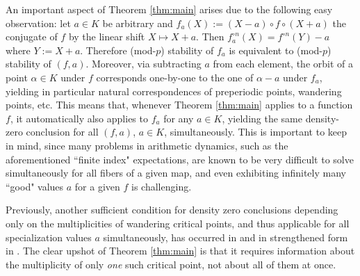 \documentclass[a4paper]{amsart}
\begin{document}
An important aspect of Theorem \ref{thm:main} arises due to the following easy observation: let $a\in K$ be arbitrary and $f_a(X):=(X-a)\circ f\circ (X+a)$ the conjugate of $f$ by the linear shift $X\mapsto X+a$. Then $f_a^{\circ n}(X) = f^{\circ n}(Y) - a$ where $Y:=X+a$. Therefore (mod-$p$) stability of $f_a$ is equivalent to (mod-$p$) stability of $(f,a)$. Moreover, via subtracting $a$ from each element, the orbit of a point $\alpha\in K$ under $f$ corresponds one-by-one to the one of $\alpha-a$ under $f_a$, yielding in particular natural correspondences of preperiodic points, wandering points, etc. This means that, whenever Theorem \ref{thm:main} applies to a function $f$, it automatically also applies to $f_a$ for any $a\in K$, yielding the same density-zero conclusion for all $(f,a)$, $a\in K$, simultaneously. This is important to keep in mind, since many problems in arithmetic dynamics, such as the aforementioned ``finite index" expectations, are known to be very difficult to solve simultaneously for all fibers of a given map, and even exhibiting infinitely many ``good" values $a$ for a given $f$ is challenging. 

Previously, another sufficient condition for density zero conclusions depending only on the multiplicities of wandering critical points, and thus applicable for all specialization values $a$ simultaneously, has occurred in \cite[Theorem 1.2]{MOS} and in strengthened form in \cite{OS}.  The clear upshot of Theorem \ref{thm:main} is that it requires information about the multiplicity of only {\it one} such critical point, not about all of them at once. 
\end{document}
